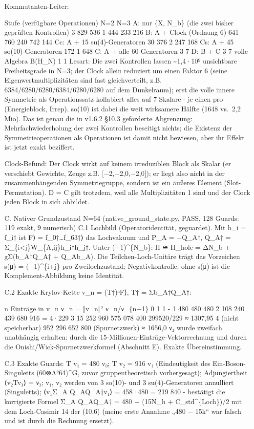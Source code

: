 Kommutanten-Leiter:

Stufe (verfügbare Operationen) N=2 N=3 A: nur \{X, N\_b\} (die zwei
bisher geprüften Kontrollen) 3 829 536 1 444 233 216 B: A + Clock
(Ordnung 6) 641 760 240 742 144 Cc: A + 15 su(4)-Generatoren 30 376 2
247 168 Cs: A + 45 so(10)-Generatoren 172 1 648 C: A + alle 60
Generatoren 3 7 D: B + C 3 7 volle Algebra B(H\_N) 1 1 Lesart: Die zwei
Kontrollen lassen \textasciitilde1,4·10⁹ unsichtbare Freiheitsgrade in
N=3; der Clock allein reduziert um einen Faktor 6 (seine
Eigenwertmultiplizitäten sind fast gleichverteilt, z.B.
6384/6280/6280/6384/6280/6280 auf dem Dunkelraum); erst die volle innere
Symmetrie als Operationssatz kollabiert alles auf 7 Skalare - je einen
pro (Energieblock, Irrep). so(10) ist dabei die weit wirksamere Hälfte
(1648 vs.~2,2 Mio). Das ist genau die in v1.6.2 §10.3 geforderte
Abgrenzung: Mehrfachwiederholung der zwei Kontrollen beseitigt nichts;
die Existenz der Symmetrieoperationen als Operationen ist damit nicht
bewiesen, aber ihr Effekt ist jetzt exakt beziffert.

Clock-Befund: Der Clock wirkt auf keinem irreduziblen Block als Skalar
(er verschiebt Gewichte, Zeuge z.B. {[}−2,−2,0,−2,0{]}); er liegt also
nicht in der zusammenhängenden Symmetriegruppe, sondern ist ein äußeres
Element (Slot-Permutation). D = C gilt trotzdem, weil alle
Multiplizitäten 1 sind und der Clock jeden Block in sich abbildet.

C. Nativer Grundzustand N=64 (native\_ground\_state.py, PASS, 128
Guards: 119 exakt, 9 numerisch) C.1 Lochbild (Operatoridentität,
geguardet). Mit h\_i = f\_i† ist \textbar F⟩ =
f\_0†\ldots f\_63†⟩ das Lochvakuum und P\_A = −Q\_A†, Q\_A† =
Σ\_\{i\textless j\}W\_\{A,ij\}h\_i†h\_j†. Unter (−1)\^{}\{N\_b\}: H ≅
H\_hole = ΔN\_b + gΣ(b\_A†Q\_A† + Q\_Ab\_A). Die Teilchen-Loch-Unitäre
trägt das Vorzeichen s(μ) = (−1)\^{}\{i+j\} pro Zweilochzustand;
Negativkontrolle: ohne s(μ) ist die Komplement-Abbildung keine
Identität.

C.2 Exakte Krylov-Kette v\_n = (T†)ⁿ\textbar F⟩, T† = Σb\_A†Q\_A†:

n Einträge in v\_n ν\_n = ‖v\_n‖² ν\_n/ν\_\{n−1\} 0 1 1 - 1 480 480 480
2 108 240 439 680 916 = 4·229 3 15 252 960 575 078 400 299520/229 ≈
1307,95 4 (nicht speicherbar) 952 296 652 800 (Spurnetzwerk) ≈ 1656,0 ν₃
wurde zweifach unabhängig erhalten: durch die
15-Millionen-Einträge-Vektorrechnung und durch die
Onishi/Wick-Spurnetzwerkformel (Abschnitt E). Exakte Übereinstimmung.

C.3 Exakte Guards: T v₁ = 480 v₀; T v₂ = 916 v₁ (Eindeutigkeit des
Ein-Boson-Singuletts (60⊗Λ²64̄)\^{}G, zuvor gruppentheoretisch
vorhergesagt); Adjungiertheit ⟨v₂\textbar Tv₃⟩ = ν₃; v₁, v₂ werden von 3
so(10)- und 3 su(4)-Generatoren annulliert (Singuletts);
⟨v₁\textbar Σ\_A Q\_AQ\_A†\textbar v₁⟩ = 458·480 = 219 840 - bestätigt
die korrigierte Formel Σ\_A Q\_AQ\_A† = 480 − (15N\_h +
C\_std\^{}\{Loch\})/2 mit dem Loch-Casimir 14 der (10,6) (meine erste
Annahme „480 − 15k`` war falsch und ist durch die Rechnung ersetzt).

